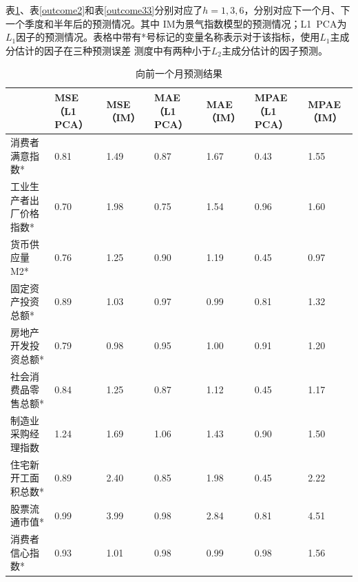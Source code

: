表\ref{outcome1}、表\ref{outcome2}和表\ref{outcome33}分别对应了$h = 1, 3, 6$，分别对应下一个月、下一个季度和半年后的预测情况。其中
IM为景气指数模型的预测情况；L1\ PCA为$L_1$因子的预测情况。表格中带有*号标记的变量名称表示对于该指标，使用$L_1$主成分估计的因子在三种预测误差
测度中有两种小于$L_2$主成分估计的因子预测。

\begin{table}[H]
    \small
    \caption{向前一个月预测结果}
    \label{outcome1}
    \centering
    \begin{tabularx}{\textwidth}{lXXXXXX}
    \toprule
                     &  MSE（L1 PCA） &  MSE（IM） &  MAE（L1 PCA） &  MAE（IM） &  MPAE（L1 PCA） &  MPAE（IM） \\ \midrule
    消费者满意指数*     & 0.81            & 1.49        & 0.87            & 1.67        & 0.43             & 1.55         \\
    工业生产者出厂价格指数* & 0.70            & 1.98        & 0.75            & 1.54        & 0.96             & 1.60         \\
    货币供应量M2*      & 0.76            & 1.25        & 0.90            & 1.19        & 0.45             & 0.97         \\
    固定资产投资总额*  & 0.89            & 1.03        & 0.97            & 0.99        & 0.81             & 1.32         \\
    房地产开发投资总额* & 0.79            & 0.98        & 0.95            & 1.00        & 0.91             & 1.20         \\
    社会消费品零售总额* & 0.84            & 1.25        & 0.87            & 1.12        & 0.45             & 1.17         \\
    制造业采购经理指数    & 1.24           & 1.69        & 1.06            & 1.43        & 0.90             & 1.50         \\
    住宅新开工面积总数*  & 0.89            & 2.40        & 0.85            & 1.98        & 0.45             & 2.22         \\
    股票流通市值*      & 0.99            & 3.99        & 0.98            & 2.84        & 0.81             & 4.51         \\
    消费者信心指数*     & 0.93            & 1.01        & 0.98            & 0.99        & 0.98             & 1.56         \\ \bottomrule
    \end{tabularx}
\end{table}

